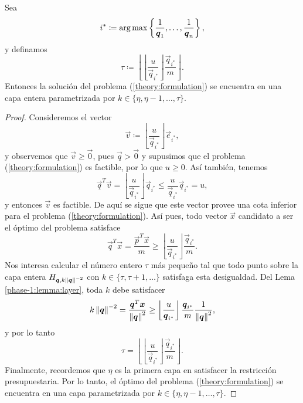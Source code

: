 \begin{lemma}
	Sea
	\begin{equation}
		\label{eq:last-index}
		i^* \coloneq \operatorname{arg\,max} \left\lbrace \frac{1}{\boldsymbol{q}_1}, \ldots, \frac{1}{\boldsymbol{q}_n} \right\rbrace,
	\end{equation}
	y definamos
	\begin{equation}
		\label{eq:tau}
		\tau \coloneq \left\lfloor \left\lfloor \frac{u}{\vec{q}_{i^*}} \right\rfloor
			\frac{\vec{q}_{i^*}}{m} \right\rfloor.
	\end{equation}
	Entonces la solución del problema (\ref{theory:formulation}) se encuentra en una capa entera
	parametrizada por $k \in \lbrace \eta, \eta - 1, \ldots, \tau \rbrace$.
\end{lemma}
\begin{proof}
	Consideremos el vector
	\begin{equation*}
		\vec{v} \coloneq \left\lfloor \frac{u}{\vec{q}_{i^*}} \right\rfloor \vec{e}_{i^*},
	\end{equation*}
	y observemos que $\vec{v} \geq \vec{0}$, pues $\vec{q} > \vec{0}$ y supusimos que el problema
	(\ref{theory:formulation}) es factible, por lo que $u \geq 0$. Así también, tenemos
	\begin{equation*}
		\vec{q}^T\vec{v} = \left\lfloor \frac{u}{\vec{q}_{i^*}} \right\rfloor \vec{q}_{i^*}
		\leq \frac{u}{\vec{q}_{i^*}}\vec{q}_{i^*} = u,
	\end{equation*}
	y entonces $\vec{v}$ es factible. De aquí se sigue que este vector provee una cota inferior para
	el problema (\ref{theory:formulation}). Así pues, todo vector $\vec{x}$ candidato a ser el
	óptimo del problema satisface
	\begin{equation*}
		\vec{q}^T\vec{x} = \frac{\vec{p}^T\vec{x}}{m} \geq \left\lfloor \frac{u}{\vec{q}_{i^*}}
		\right\rfloor \frac{\vec{q}_{i^*}}{m}.
	\end{equation*}
	Nos interesa calcular el número entero $\tau$ más pequeño tal que todo punto sobre la capa
	entera $H_{\boldsymbol{q}, k\left\lVert \boldsymbol{q} \right\rVert^{-2}}$ con $k \in \lbrace \tau, \tau + 1, \ldots \rbrace$
	satisfaga esta desigualdad. Del Lema \ref{phase-1:lemma:layer}, toda $k$ debe satisfacer
	\begin{equation*}
		k\left\lVert \boldsymbol{q} \right\rVert^{-2} = \frac{\boldsymbol{q}^T\boldsymbol{x}}{\left\lVert \boldsymbol{q} \right\rVert^2} \geq
		\left\lfloor \frac{u}{\boldsymbol{q}_{i^*}} \right\rfloor \frac{\boldsymbol{q}_{i^*}}{m}
		\frac{1}{\left\lVert \boldsymbol{q} \right\rVert^2},
	\end{equation*}
	y por lo tanto
	\begin{equation*}
		\tau =
		\left\lfloor \left\lfloor \frac{u}{\vec{q}_{i^*}} \right\rfloor \frac{\vec{q}_{i^*}}{m}
			\right\rfloor.
	\end{equation*}
	Finalmente, recordemos que $\eta$ es la primera capa en satisfacer la restricción presupuestaria.
	Por lo tanto, el óptimo del problema (\ref{theory:formulation}) se encuentra en una capa
	parametrizada por $k \in \lbrace \eta, \eta - 1, \ldots, \tau \rbrace$.
\end{proof}

